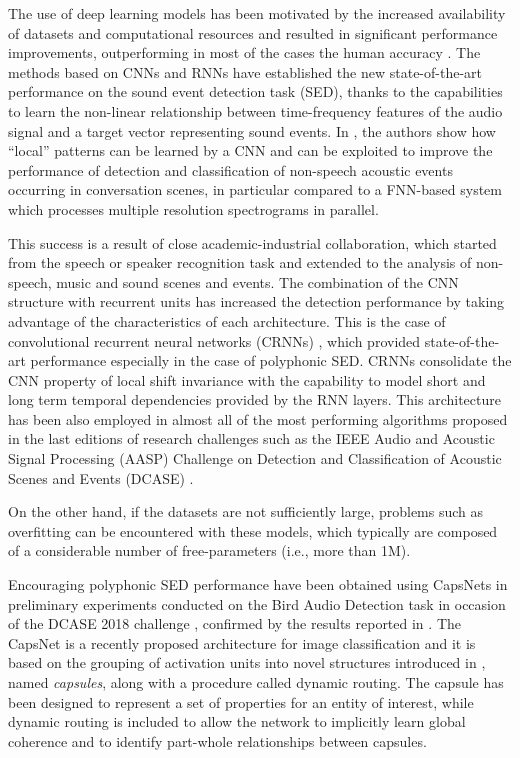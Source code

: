 The use of deep learning models has been motivated by the increased availability of datasets and computational resources and resulted in significant performance improvements, outperforming in most of the cases the human accuracy \cite{sailor2017unsupervised}.
The methods based on CNNs and RNNs have established the new state-of-the-art performance on the sound event detection task (SED), thanks to the capabilities to learn the non-linear relationship between time-frequency features of the audio signal and a target vector representing sound events. In \cite{espi2015}, the authors show how ``local'' patterns can be learned by a CNN and can be exploited to improve the performance of detection and classification of non-speech acoustic events occurring in conversation scenes, in particular compared to a FNN-based system which processes multiple resolution spectrograms in parallel. 

This
success is a result of close academic-industrial collaboration, which started from the speech or speaker recognition task and extended to the analysis of non-speech, music and sound scenes and events. The combination of the CNN structure with recurrent units has increased the detection performance by taking advantage of the characteristics of each architecture. This is the case of convolutional recurrent neural networks (CRNNs) \cite{cakir2017convolutional}, which provided state-of-the-art performance especially in the case of polyphonic SED. CRNNs consolidate the CNN property of local shift invariance with the capability to model short and long term temporal dependencies provided by the RNN layers. This architecture has been also employed in almost all of the most performing algorithms proposed in the last editions of research challenges such as the IEEE Audio and Acoustic Signal Processing (AASP) Challenge on  Detection and Classification of Acoustic Scenes and Events (DCASE) \cite{DCASE2017Workshop}. 

On the other hand, if the datasets are not sufficiently large, problems such as overfitting can be encountered with these models, which typically are composed of a considerable number of free-parameters (i.e., more than 1M). 

Encouraging polyphonic SED performance have been obtained using CapsNets in preliminary experiments conducted on the Bird Audio Detection task in occasion of the DCASE 2018 challenge \cite{vesperini2018capsule}, confirmed by the results reported in \cite{iqbal2018capsule}.
The CapsNet \cite{sabour2017dynamic} is a recently proposed architecture for image classification and it is based on the grouping of activation units into novel structures introduced in \cite{hinton2011transforming}, named \textit{capsules}, along with a procedure called dynamic routing. The capsule has been designed to represent a set of properties for an entity of interest, while dynamic routing is included to allow the network to implicitly learn global coherence and to identify part-whole relationships between capsules.

